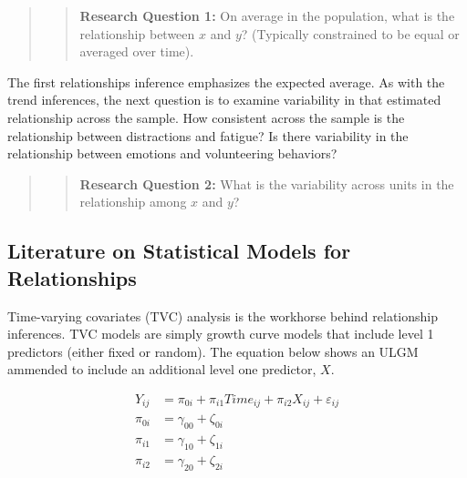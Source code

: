 \documentclass[english,,man]{apa6}
\begin{document}
\begin{quote}
\begin{quote}
\textbf{Research Question 1:} On average in the population, what is the relationship between \(x\) and \(y\)? (Typically constrained to be equal or averaged over time).
\end{quote}
\end{quote}

The first relationships inference emphasizes the expected average. As with the trend inferences, the next question is to examine variability in that estimated relationship across the sample. How consistent across the sample is the relationship between distractions and fatigue? Is there variability in the relationship between emotions and volunteering behaviors?

\begin{quote}
\begin{quote}
\textbf{Research Question 2:} What is the variability across units in the relationship among \(x\) and \(y\)?
\end{quote}
\end{quote}

\hypertarget{literature-on-statistical-models-for-relationships}{%
\subsection{Literature on Statistical Models for Relationships}\label{literature-on-statistical-models-for-relationships}}

Time-varying covariates (TVC) analysis is the workhorse behind relationship inferences. TVC models are simply growth curve models that include level 1 predictors (either fixed or random). The equation below shows an ULGM ammended to include an additional level one predictor, \(X\).

\begin{align}
\label{ULGM}
Y_{ij} &= \pi_{0i} + \pi_{i1}Time_{ij} + \pi_{i2}X_{ij} + \varepsilon_{ij} \\
\pi_{0i} &= \gamma_{00} + \zeta_{0i} \\
\pi_{i1} &= \gamma_{10} + \zeta_{1i} \\
\pi_{i2} &= \gamma_{20} + \zeta_{2i}
\end{align}
\end{document}
